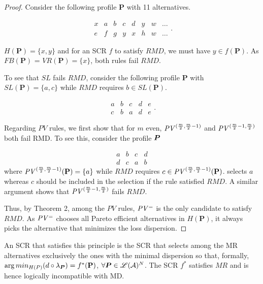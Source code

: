\documentclass[version=3.21, pagesize, twoside=off, bibliography=totoc, DIV=calc, fontsize=12pt, a4paper]{scrartcl}
\begin{document}
\begin{proof}
Consider the following profile $\mathbf{P}$ with 11 alternatives.

	\begin{equation}
		\begin{array}{llllllll}
			x&a&b&c&d&y&w&\ldots \\		e&f&g&y&x&h&w&\ldots
		\end{array}.
	\end{equation}


$H(\mathbf{P})=\{x, y\}$ and for an SCR $f$ to satisfy $RMD$, we must have $y\in   f(\mathbf{P})$. As $FB(\mathbf{P})$ = $VR(\mathbf{P})=\{x\}$, both rules fail $RMD$. 

To see that $SL$ fails $RMD$, consider the following profile $\mathbf{P}$ with $SL(\mathbf{P})=\{a, c\}$ while $RMD$ requires $b\in SL(\mathbf{P})$. 


	\begin{equation}
		\begin{array}{lllll}
			a&b&c&d&e \\		c&b&a&d&e
		\end{array}.
	\end{equation}


Regarding $PV$ rules, we first show that for $m$ even, $\PVv[(\frac{m}{2}, \frac{m}{2} - 1)]$ and $\PVv[(\frac{m}{2} - 1, \frac{m}{2})]$ both fail RMD. To see this, consider the profile $\bm{P}$

	\begin{equation}
		\begin{array}{llll}
			a&b&c&d \\		d&c&a&b
		\end{array}
	\end{equation}
where $\PVv[(\frac{m}{2}, \frac{m}{2} - 1)](\mathbf{P})=\{a\}$ while $RMD$ requires $c\in \PVv[(\frac{m}{2}, \frac{m}{2} - 1)](\mathbf{P})$.  selects $a$ whereas $c$ should be included in the selection if the rule satisfied $RMD$. A similar argument shows that $\PVv[(\frac{m}{2} - 1, \frac{m}{2})]$ fails $RMD$.

Thus, by Theorem 2, among the $PV$ rules, $\mathit{PV^=}$ is the only candidate to satisfy $RMD$. As $\mathit{PV^=}$ chooses all Pareto efficient alternatives in $H(\mathbf{P})$, it always picks the alternative that minimizes the loss dispersion.
\end{proof}


An SCR that satisfies this principle is the SCR that selects among the MR alternatives exclusively the ones with the minimal dispersion so that, formally, $ \arg min_{H(P)} (d \circ \lprof)= f^{*}(\mathbf{P})$, $\forall \bm{P} \in \mathscr{L}(\mathcal{A})^N$. The SCR $f^*$ satisfies $MR$ and is hence logically incompatible with MD. 
\end{document}
